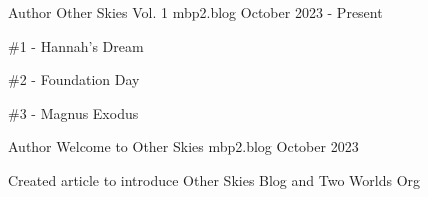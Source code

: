
\begin{cventries}
   \cventry
   {Author} %
   {Other Skies Vol. 1} %
   {mbp2.blog} %
   {October 2023 - Present} %
   {
      \begin{cvitems} %
         \item {\#1 - Hannah's Dream}
         \item {\#2 - Foundation Day}
         \item {\#3 - Magnus Exodus}
      \end{cvitems}
   }

   \cventry
   {Author} %
   {Welcome to Other Skies} %
   {mbp2.blog} %
   {October 2023} %
   {
      \begin{cvitems} %
         \item {Created article to introduce Other Skies Blog and Two Worlds Org}
      \end{cvitems}
   }

\end{cventries}